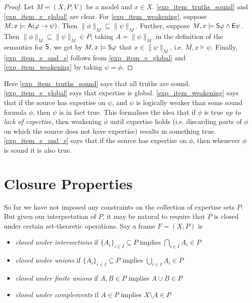 \begin{proof}

    Let $M = (X, P, V)$ be a model and $x \in X$. \cref{exp_item_truths_sound} and
    \cref{exp_item_e_global} are clear. For \cref{exp_item_weakening}, suppose $M, x
    \models \A(\phi \limplies \psi)$. Then $\|\phi\|_M \subseteq \|\psi\|_M$.
    Further, suppose $M, x \models \S\phi \land \E\psi$. Then $\|\phi\|_M
    \subseteq \|\psi\|_M \in P$; taking $A = \|\psi\|_M$ in the definition of
    the semantics for $\S$, we get by $M, x \models \S\phi$ that $x \in
    \|\psi\|_M$, i.e. $M, x \models \psi$. Finally, \cref{exp_item_e_and_s}
    follows from \cref{exp_item_e_global} and \cref{exp_item_weakening} by taking
    $\psi = \phi$.
\end{proof}

Here \cref{exp_item_truths_sound} says that all truths are sound.
\cref{exp_item_e_global} says that expertise is global. \cref{exp_item_weakening} says
that if the source has expertise on $\psi$, and $\psi$ is logically weaker than
some sound formula $\phi$, then $\psi$ is in fact true. This formalises the
idea that if $\phi$ is true \emph{up to lack of expertise}, then weakening
$\phi$ until expertise holds (i.e. discarding parts of $\phi$ on which the
source does not have expertise) results in something true. \cref{exp_item_e_and_s}
says that if the source has expertise on $\phi$, then whenever $\phi$ is sound
it is also true.

\section{Closure Properties}
\label{exp_sec_closure_properties}

So far we have not imposed any constraints on the collection of expertise sets
$P$. But given our interpretation of $P$, it may be natural to
require that $P$ is closed under certain set-theoretic operations. Say
a frame $F = (X, P)$ is

\begin{itemize}

    \item \emph{closed under intersections} if $\{A_i\}_{i \in I} \subseteq P$
          implies $\bigcap_{i \in I}{A_i} \in P$

    \item \emph{closed under unions} if $\{A_i\}_{i \in I} \subseteq P$ implies
          $\bigcup_{i \in I}{A_i} \in P$

    \item \emph{closed under finite unions} if $A, B \in P$ implies $A \cup B
          \in P$

    \item \emph{closed under complements} if $A \in P$ implies $X \setminus A
          \in P$

\end{itemize}

